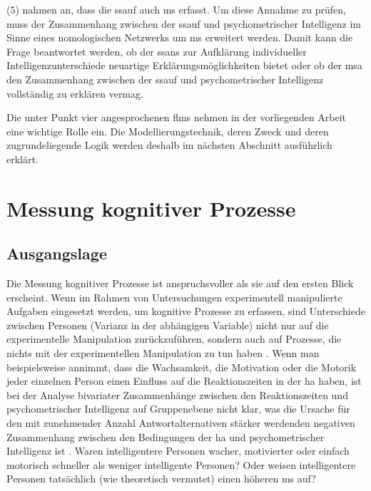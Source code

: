 \documentclass[11pt, twoside, a4paper]{book}		%
\begin{document}
($5$) \citeauthor{Melnick2013} nahmen an, dass die \gls{ssauf} auch \gls{ms} erfasst. Um diese Annahme zu prüfen, muss der Zusammenhang zwischen der \gls{ssauf}
und psychometrischer Intelligenz im Sinne eines nomologischen Netzwerks \citep{Cronbach1955} um \gls{ms} erweitert werden. 
Damit kann die Frage beantwortet werden, ob der \gls{ssans} zur Aufklärung individueller Intelligenzunterschiede neuartige Erklärungsmöglichkeiten bietet oder ob der \gls{msa} den Zusammenhang zwischen der \gls{ssauf} und psychometrischer Intelligenz vollständig zu erklären vermag.

Die unter Punkt vier angesprochenen \glspl{flm} \citep[z. B.][]{Schweizer2006a, Schweizer2006b, Schweizer2007, Schweizer2008, Schweizer2009a} nehmen in der vorliegenden Arbeit eine wichtige Rolle ein. Die Modellierungstechnik, deren Zweck und deren zugrundeliegende Logik werden deshalb im nächsten Abschnitt ausführlich erklärt.


\section{Messung kognitiver Prozesse}

\subsection{Ausgangslage}

Die Messung kognitiver Prozesse ist anspruchsvoller als sie auf den ersten Blick erscheint. Wenn im Rahmen von Untersuchungen experimentell manipulierte Aufgaben eingesetzt werden, um kognitive Prozesse zu erfassen, sind Unterschiede zwischen Personen (Varianz in der abhängigen Variable) nicht nur auf die experimentelle Manipulation zurückzuführen, sondern auch auf Prozesse, die nichts mit der experimentellen Manipulation zu tun haben \citep[]{Jensen1982b, Miller2013, Neubauer1997a, Schweizer2007, Unsworth2007, vanZomeren1994}.
Wenn man beispielsweise annimmt, dass die Wachsamkeit, die Motivation oder die Motorik jeder einzelnen Person einen Einfluss auf die Reaktionszeiten in der \gls{ha} haben, ist bei der Analyse bivariater Zusammenhänge zwischen den Reaktionszeiten und psychometrischer Intelligenz auf Gruppenebene nicht klar, was die Ursache für den mit zunehmender Anzahl Antwortalternativen stärker werdenden negativen Zusammenhang zwischen den Bedingungen der \gls{ha} und psychometrischer Intelligenz ist \citep{Sheppard2008}. Waren intelligentere Personen wacher, motivierter oder einfach motorisch schneller als weniger intelligente Personen? Oder weisen intelligentere Personen tatsächlich (wie theoretisch vermutet) einen höheren \gls{ms} auf?
\end{document}
